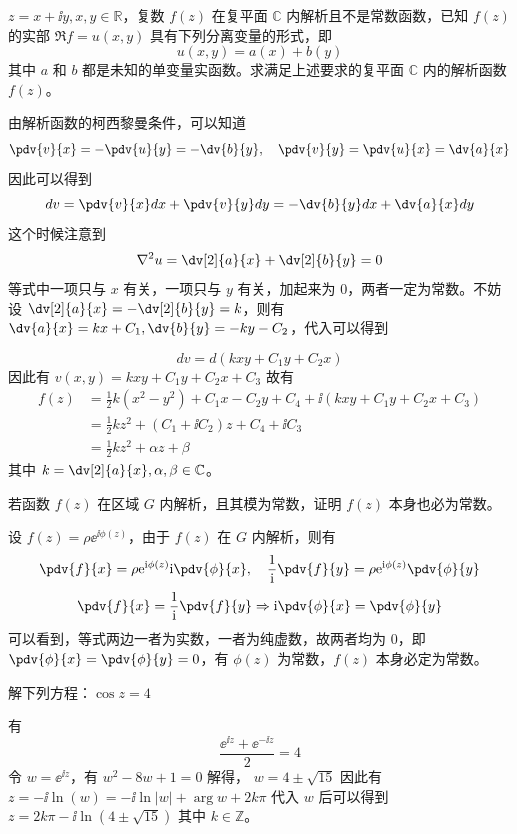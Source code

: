 \begin{question}
\(z=x+\ii y, x,y \in \mathbb{R}\)，复数 \(f(z)\) 在复平面 \(\mathbb{C}\) 内解析且不是常数函数，已知 \(f(z)\) 的实部 \(\Re f=u(x,y)\) 具有下列分离变量的形式，即 \[
u(x,y) = a(x) + b(y)
\]
其中 \(a\) 和 \(b\) 都是未知的单变量实函数。求满足上述要求的复平面 \(\mathbb{C}\) 内的解析函数 \(f(z)\)。
\begin{solution}
由解析函数的柯西黎曼条件，可以知道 \[
\pdv{v}{x}=-\pdv{u}{y}=-\dv{b}{y}, \quad \pdv{v}{y}=\pdv{u}{x}=\dv{a}{x}
\]
因此可以得到 \[
dv=\pdv{v}{x} dx+\pdv{v}{y} dy = -\dv{b}{y} dx + \dv{a}{x} dy
\]
这个时候注意到 \[
\nabla^2 u = \dv[2]{a}{x} + \dv[2]{b}{y}=0
\]
等式中一项只与 \(x\) 有关，一项只与 \(y\) 有关，加起来为 \(0\)，两者一定为常数。不妨设 \(\dv[2]{a}{x}=-\dv[2]{b}{y}=k\)，则有 \(\dv{a}{x}=k x + C_1,\dv{b}{y}=-k y - C_2\)，代入可以得到

\[
dv =  d(k x y + C_1 y + C_2 x)
\]
因此有 \(v(x,y) = k x y + C_1 y + C_2 x + C_3\)
故有 \[
\begin{aligned}
f(z)&=\frac12 k (x^2 - y^2) + C_1 x - C_2 y + C_4 + \ii (k x y +C_1 y + C_2 x + C_3) \\
&= \frac12 k z^2 + (C_1 +\ii C_2) z + C_4 + \ii C_3 \\
&= \frac12 k z^2 + \alpha z + \beta
\end{aligned}
\]
其中 \(k= \dv[2]{a}{x}, \alpha,\beta \in \mathbb{C}\)。
\end{solution}
\end{question}

\begin{question}
若函数 \(f(z)\) 在区域 \(G\) 内解析，且其模为常数，证明 \(f(z)\) 本身也必为常数。
\begin{solution}
设 \(f(z) = \rho \ee^{\ii \phi(z)}\)，由于 \(f(z)\) 在 \(G\) 内解析，则有 \[
\pdv{f}{x}= \rho \ee^{\ii \phi(z)} \ii \pdv{\phi}{x}, \quad \frac{1}{\ii} \pdv{f}{y} = \rho \ee^{\ii \phi(z)} \pdv{\phi}{y}
\]
\[
\pdv{f}{x} =\frac{1}{\ii} \pdv{f}{y} \Rightarrow \ii \pdv{\phi}{x} = \pdv{\phi}{y}
\]
可以看到，等式两边一者为实数，一者为纯虚数，故两者均为 \(0\)，即 \(\pdv{\phi}{x}=\pdv{\phi}{y}=0\)，有 \(\phi(z)\) 为常数，\(f(z)\) 本身必定为常数。
\end{solution}
\end{question}

\begin{question}
解下列方程：\( \cos z = 4 \)
\begin{solution}
有
\[
\frac{\ee^{\ii z} + \ee^{-\ii z}}{2} = 4
\]
令 \(w = \ee^{\ii z}\)，有 \( w^2 -8 w + 1=0 \)
解得， \( w=4 \pm \sqrt{15} \)
因此有 \( z= -\ii \ln(w) = -\ii \ln |w| + \arg w + 2k \pi \)
代入 \(w\) 后可以得到 \( z=2k \pi - \ii \ln (4 \pm \sqrt{15}) \)
其中 \(k \in \mathbb{Z}\)。
\end{solution}
\end{question}

